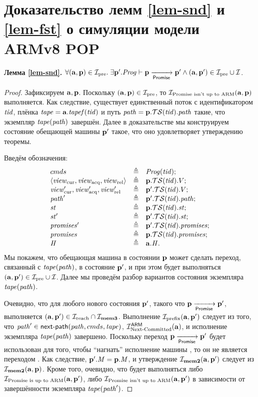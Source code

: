 \chapter{Доказательство лемм \ref{lem-snd} и \ref{lem-fst} о симуляции модели ARMv8 POP}
\label{sec:appendix-pop-proofs}

\noindent
\textbf{Лемма \ref{lem-snd}.}
$\forall (\aT, \p) \in \simrelPre. \;
\exists \p'. \Cfprom \vdash \p \promStep \p' \land (\aT, \p') \in \simrelPre \cup \simrel$.
\begin{proof}
Зафиксируем $\aT, \p$.
Поскольку $(\aT, \p) \in \simrelPre$, то $\invPromUptoARMnot(\aT, \p)$ выполняется.
Как следствие, существует единственный поток с идентификатором $\tId$, плёнка $\tape = \aT.\tapef(\tId)$ и
путь $\cpath = \p.\TSfprom(\tId).\cpath$ такие, что экземпляр $\tape(\cpath)$ завершён.
Далее в доказательстве мы конструируем состояние обещающей машины $\p'$ такое, что 
оно удовлетворяет утверждению теоремы.

Введём обозначения:
\[\begin{array}{l l l}
  \Carm & \triangleq & \Cfarm(\tId); \\
  \angled{\Rcur, \Racq, \Rrel} & \triangleq & \p.\TSfprom(\tId).\V; \\
  \Rcur', \Racq', \Rrel' & \triangleq & \p'.\TSfprom(\tId).\V;\\
  \cpath' & \triangleq & \p'.\TSfprom(\tId).\cpath;\\
  \PromState & \triangleq & \p.\TSfprom(\tId).\PromState;\\
  \PromState' & \triangleq & \p'.\TSfprom(\tId).\PromState;\\
  \PromSet' & \triangleq & \p'.\TSfprom(\tId).\PromSet;\\
  \PromSet & \triangleq & \p.\TSfprom(\tId).\PromSet;\\
  \hmap   & \triangleq & \aT.\hmap.
\end{array}\]
Мы покажем, что обещающая машина в состоянии $\p$ может сделать переход, связанный с $\tape(\cpath)$, в состояние $\p'$,
и при этом будет выполняться $(\aT, \p') \in \simrelPre \cup \simrel$.
Далее мы проведём разбор вариантов состояния экземпляра $\tape(\cpath)$.

Очевидно, что для любого нового состояния $\p'$, такого что $\p \promStep \p'$, выполняется 
$(\aT, \p') \in \invReach \cap \invMemThree$.
Выполнение $\invPrefix(\aT, \p')$ следует из того, что
  $\cpath' \in \nextPathCom{\cpath}{\Carm}{\tape}$, $\invAnextCommitted(\aT)$, и исполнение экземпляра $\tape(\cpath)$ завершено.
Поскольку переход $\p \promStep \p'$ будет использован для того, чтобы ``нагнать'' исполнение машины \ARMt,
то он не является переходом . Как следствие, $\p'.\Mprom = \p.\Mprom$, и 
утверждение $\invMemTwo(\aT, \p')$ следует из $\invMemTwo(\aT, \p)$.
Кроме того, очевидно, что будет выполняться
либо $\invPromUptoARM(\aT, \p')$, либо $\invPromUptoARMnot(\aT, \p')$ в зависимости от
завершённости экземпляра $\tape(\cpath')$.


\end{proof}
